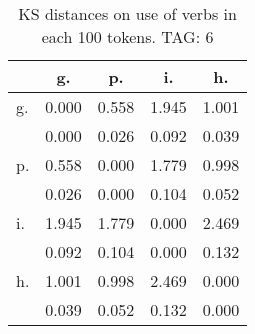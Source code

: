 \begin{table}[h!]
\begin{center}
\begin{tabular}{| l | c | c | c | c |}\hline
 & g. & p. & i. & h. \\\hline
g. & 0.000  & 0.558  & 1.945  & 1.001 \\\hline
 & 0.000  & 0.026  & 0.092  & 0.039 \\\hline
p. & 0.558  & 0.000  & 1.779  & 0.998 \\\hline
 & 0.026  & 0.000  & 0.104  & 0.052 \\\hline
i. & 1.945  & 1.779  & 0.000  & 2.469 \\\hline
 & 0.092  & 0.104  & 0.000  & 0.132 \\\hline
h. & 1.001  & 0.998  & 2.469  & 0.000 \\\hline
 & 0.039  & 0.052  & 0.132  & 0.000 \\\hline
\end{tabular}
\caption{KS distances on use of verbs in each 100 tokens. TAG: 6}
\end{center}
\end{table}